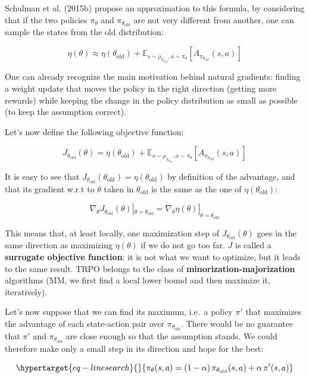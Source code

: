 \documentclass[
  letterpaper,
  DIV=11,
  numbers=noendperiod]{scrreprt}
\begin{document}
Schulman et al. (2015b) propose an approximation to this formula, by
considering that if the two policies \(\pi_\theta\) and
\(\pi_{\theta_\text{old}}\) are not very different from another, one can
sample the states from the old distribution:

\[
    \eta(\theta) \approx \eta(\theta_\text{old}) + \mathbb{E}_{s \sim \rho_{\pi_{\theta_\text{old}}}, a \sim \pi_\theta} [A_{\pi_{\theta_\text{old}}}(s, a)]
\]

One can already recognize the main motivation behind natural gradients:
finding a weight update that moves the policy in the right direction
(getting more rewards) while keeping the change in the policy
distribution as small as possible (to keep the assumption correct).

Let's now define the following objective function:

\[
    J_{\theta_\text{old}}(\theta) = \eta(\theta_\text{old}) + \mathbb{E}_{s \sim \rho_{\pi_{\theta_\text{old}}}, a \sim \pi_\theta} [A_{\pi_{\theta_\text{old}}}(s, a)]
\]

It is easy to see that
\(J_{\theta_\text{old}}(\theta_\text{old}) = \eta(\theta_\text{old})\)
by definition of the advantage, and that its gradient w.r.t to
\(\theta\) taken in \(\theta_\text{old}\) is the same as the one of
\(\eta(\theta_\text{old})\):

\[
    \nabla_\theta J_{\theta_\text{old}}(\theta)|_{\theta = \theta_\text{old}} = \nabla_\theta \eta(\theta)|_{\theta = \theta_\text{old}}
\]

This means that, at least locally, one maximization step of
\(J_{\theta_\text{old}}(\theta)\) goes in the same direction as
maximizing \(\eta(\theta)\) if we do not go too far. \(J\) is called a
\textbf{surrogate objective function}: it is not what we want to
optimize, but it leads to the same result. TRPO belongs to the class of
\textbf{minorization-majorization} algorithms (MM, we first find a local
lower bound and then maximize it, iteratively).

Let's now suppose that we can find its maximum, i.e.~a policy \(\pi'\)
that maximizes the advantage of each state-action pair over
\(\pi_{\theta_\text{old}}\). There would be no guarantee that \(\pi'\)
and \(\pi_{\theta_\text{old}}\) are close enough so that the assumption
stands. We could therefore make only a small step in its direction and
hope for the best:

\begin{equation}\protect\hypertarget{eq-linesearch}{}{
    \pi_\theta(s, a) = (1-\alpha) \, \pi_{\theta_\text{old}}(s, a) + \alpha \, \pi'(s,a)
}\label{eq-linesearch}\end{equation}
\end{document}
